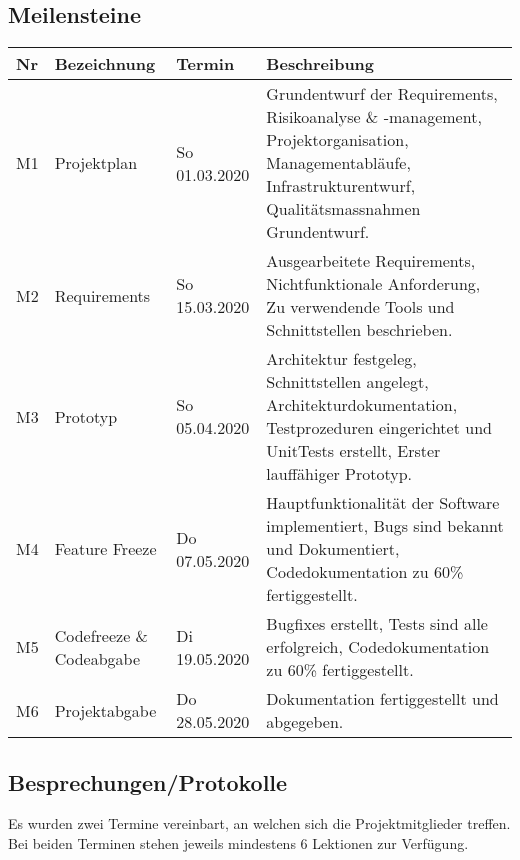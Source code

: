 \documentclass[
	ngerman,
	toc=listof, %
	toc=bibliography, %
	footnotes=multiple, %
	parskip=half, %
	numbers=noendperiod %
]{scrartcl}
\begin{document}
	\subsection{Meilensteine}
		\begin{tabularx}{0.9\linewidth}{lllX}
			\toprule
			Nr & Bezeichnung & Termin & Beschreibung \\
			\midrule
			M1 & Projektplan & So 01.03.2020 & Grundentwurf der Requirements, Risikoanalyse \& -management, Projektorganisation, Managementabläufe, Infrastrukturentwurf, Qualitätsmassnahmen Grundentwurf.\\
			\midrule
			M2 & Requirements & So 15.03.2020 & Ausgearbeitete Requirements, Nichtfunktionale Anforderung, Zu verwendende Tools und Schnittstellen beschrieben.\\
			\midrule 
			M3 & Prototyp & So 05.04.2020 & Architektur festgeleg, Schnittstellen angelegt, Architekturdokumentation, Testprozeduren eingerichtet und UnitTests erstellt, Erster lauffähiger Prototyp.\\
			\midrule
			M4 & Feature Freeze & Do 07.05.2020 & Hauptfunktionalität der Software implementiert, Bugs sind bekannt und Dokumentiert, Codedokumentation zu 60\% fertiggestellt.\\
			\midrule
			M5 & Codefreeze \& Codeabgabe & Di 19.05.2020 & Bugfixes erstellt, Tests sind alle erfolgreich, Codedokumentation zu 60\% fertiggestellt.\\
			\midrule
			M6 & Projektabgabe & Do 28.05.2020 & Dokumentation fertiggestellt und abgegeben.\\
			\bottomrule
		\end{tabularx}

	\subsection{Besprechungen/Protokolle}
	\label{sec:dates}
		Es wurden zwei Termine vereinbart, an welchen sich die Projektmitglieder treffen. 
		Bei beiden Terminen stehen jeweils mindestens 6 Lektionen zur Verfügung.
\end{document}
